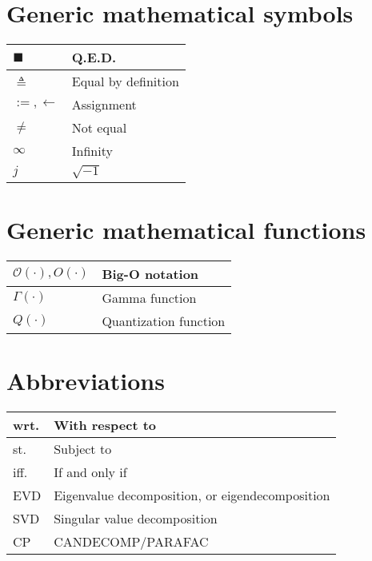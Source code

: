 \documentclass{article}
\begin{document}
\section{Generic mathematical symbols}
\begin{xltabular}{\textwidth}{XX}
    \(\blacksquare\) & Q.E.D. \\ \hline
    \(\triangleq\) & Equal by definition\\ \hline
    \(:=, \leftarrow\) & Assignment \cite{rosenDiscreteMathematicsIts2011}\\ \hline
    \(\neq\) & Not equal\\ \hline
    \(\infty\) & Infinity\\ \hline
    \(j\) & \(\sqrt{-1}\)\\
\end{xltabular}

\section{Generic mathematical functions}
\begin{xltabular}{\textwidth}{XX}
    \(\mathcal{O}(\cdot), O(\cdot)\) & Big-O notation\\ \hline
    \(\Gamma(\cdot)\) & Gamma function\\ \hline
    \(Q(\cdot)\) & Quantization function
\end{xltabular}

\section{Abbreviations}
\begin{xltabular}{\textwidth}{XX}
    wrt. & With respect to\\ \hline
    st. & Subject to\\ \hline
    iff. & If and only if\\ \hline
    EVD & Eigenvalue decomposition, or eigendecomposition \cite{nossekAdaptiveArraySignal2015}\\ \hline
    SVD & Singular value decomposition\\ \hline
    CP & CANDECOMP/PARAFAC\\
\end{xltabular}

\printbibliography
\end{document}
